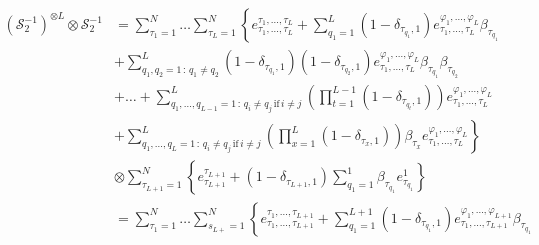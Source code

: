 \documentclass[11pt]{article}
\numberwithin{equation}{section}
\numberwithin{equation}{subsection}
\begin{document}
\begin{align*}
    	\left(\mathcal{S}_{2}^{-1}\right)^{\otimes L}\otimes \mathcal{S}_{2}^{-1}&=%
    	\sum_{\tau_{1}=1}^{N}\ldots\sum_{\tau_{L}=1}^{N}\left\{e_{\tau_{1},\ldots,\tau_{L}}^{\tau_{1},\ldots,\tau_{L}}+\sum_{q_{1}=1}^{L}(1-\delta_{\tau_{q_{1}},1})e_{\tau_{1},\ldots,\tau_{L}}^{\varphi_{1},\ldots,\varphi_{L}}\beta_{\tau_{q_{1}}}\right. 
    	\\&+\left. \sum_{q_{1},q_{2}=1\,:\,q_{1}\neq q_{2}}^{L}(1-\delta_{\tau_{q_{1}},1})(1-\delta_{\tau_{q_{2}},1})e^{\varphi_{1},\ldots,\varphi_{L}}_{\tau_{1},\ldots,\tau_{L}}\beta_{\tau_{q_{1}}}\beta_{\tau_{q_{2}}}\right.
    	\\&+\left.
    	\ldots+	\sum_{q_{1},\ldots,q_{L-1}=1\,:\,q_{i}\neq q_{j}\,\text{if}\,i\neq j}^{L}\left(\prod_{t=1}^{L-1}(1-\delta_{\tau_{q_{t}},1})\right)e_{\tau_{1},\ldots,\tau_{L}}^{\varphi_{1},\ldots,\varphi_{L}}
    	\right. \\&+ \left. 
    	\sum_{q_{1},\ldots,q_{L}=1\,:\,q_{i}\neq q_{j}\,\text{if}\,i\neq j}^{L}\left(\prod_{x=1}^{L}(1-\delta_{\tau_{x},1})\right)\beta_{\tau_{x}}e_{\tau_{1},\ldots,\tau_{L}}^{\varphi_{1},\ldots,\varphi_{L}} \right\}
    	\\&
    	\otimes \sum_{\tau_{L+1}=1}^{N}\left\{e_{\tau_{L+1}}^{\tau_{L+1}}+(1-\delta_{\tau_{L+1},1})\sum_{q_{1}=1}^{1}\beta_{\tau_{q_{1}}}e_{\tau_{q_{1}}}^{1}\right\}
    	\\&=
    	\sum_{\tau_{1}=1}^{N}\ldots\sum_{s_{L+}=1}^{N}\left\{e_{\tau_{1},\ldots,\tau_{L+1}}^{\tau_{1},\ldots,\tau_{L+1}}+\sum_{q_{1}=1}^{L+1}(1-\delta_{\tau_{q_{1}},1})e_{\tau_{1},\ldots,\tau_{L+1}}^{\varphi_{1},\ldots,\varphi_{L+1}}\beta_{\tau_{q_{1}}}\right. 

\end{align*}
\end{document}
